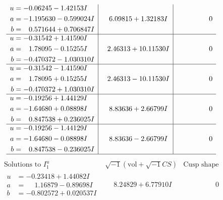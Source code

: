 \documentclass[1p]{elsarticle_modified}
\theoremstyle{definition}
\newcommand{\I}{\sqrt{-1}}
\begin{document}
$$\begin{array}{c|c|c}
\begin{aligned}
u &= -0.06245 - 1.42153 I \\
a &= -1.195630 - 0.599024 I \\
b &= \phantom{-}0.571644 + 0.706847 I\end{aligned}
 & \phantom{-}6.09815 + 1.32183 I & \phantom{-0.000000 } 0 \\ \hline\begin{aligned}
u &= -0.31542 + 1.41590 I \\
a &= \phantom{-}1.78095 - 0.15255 I \\
b &= -0.470372 - 1.030310 I\end{aligned}
 & \phantom{-}2.46313 + 10.11530 I & \phantom{-0.000000 } 0 \\ \hline\begin{aligned}
u &= -0.31542 - 1.41590 I \\
a &= \phantom{-}1.78095 + 0.15255 I \\
b &= -0.470372 + 1.030310 I\end{aligned}
 & \phantom{-}2.46313 - 10.11530 I & \phantom{-0.000000 } 0 \\ \hline\begin{aligned}
u &= -0.19256 + 1.44129 I \\
a &= -1.64680 + 0.08898 I \\
b &= \phantom{-}0.847538 + 0.236025 I\end{aligned}
 & \phantom{-}8.83636 + 2.66799 I & \phantom{-0.000000 } 0 \\ \hline\begin{aligned}
u &= -0.19256 - 1.44129 I \\
a &= -1.64680 - 0.08898 I \\
b &= \phantom{-}0.847538 - 0.236025 I\end{aligned}
 & \phantom{-}8.83636 - 2.66799 I & \phantom{-0.000000 } 0\\
 \hline 
 \end{array}$$\newpage$$\begin{array}{c|c|c}  
\text{Solutions to }I^u_{1}& \I (\text{vol} + \sqrt{-1}CS) & \text{Cusp shape}\\
 \hline 
\begin{aligned}
u &= -0.23418 + 1.44082 I \\
a &= \phantom{-}1.16879 - 0.89698 I \\
b &= -0.802572 + 0.020537 I\end{aligned}
 & \phantom{-}8.24829 + 6.77910 I & \phantom{-0.000000 } 0 \\ \hline\begin{aligned}

\end{aligned}
\end{array}$$
\end{document}
